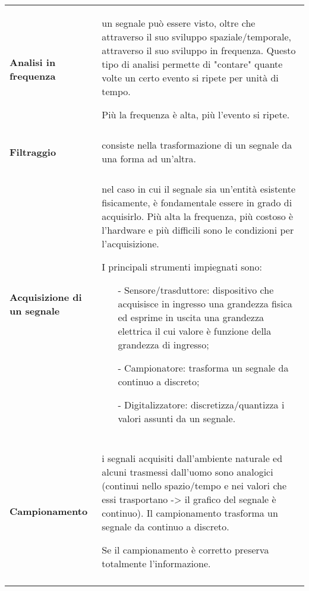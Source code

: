 \documentclass[a4paper, 10pt]{report}
\begin{document}
\begin{tabular}{lp{}}
\textbf{Analisi in frequenza} & un segnale può essere visto, oltre che attraverso il suo sviluppo spaziale/temporale, attraverso il suo sviluppo in frequenza. Questo tipo di analisi permette di "contare" quante volte un certo evento si ripete per unità di tempo.

Più la frequenza è alta, più l'evento si ripete.\\\\

\textbf{Filtraggio} & consiste nella trasformazione di un segnale da una forma ad un'altra.\\\\

\textbf{Acquisizione di un segnale} & nel caso in cui il segnale sia un'entità esistente fisicamente, è fondamentale  essere in grado di acquisirlo. Più alta la frequenza, più costoso è l’hardware  e più difficili sono le condizioni per l'acquisizione. 

I principali strumenti impiegnati sono:
\begin{itemize}
\item[-] Sensore/trasduttore: dispositivo che acquisisce in ingresso una grandezza fisica ed esprime in uscita una grandezza elettrica il cui valore è funzione della grandezza di ingresso;
\item[-] Campionatore: trasforma un segnale da continuo a discreto;
\item[-] Digitalizzatore: discretizza/quantizza i valori assunti da un segnale.
\end{itemize}

\\\\ \textbf{Campionamento} & i segnali acquisiti dall’ambiente naturale ed alcuni trasmessi dall’uomo sono analogici (continui nello spazio/tempo e nei valori che essi trasportano -> il grafico del segnale è continuo). Il campionamento trasforma un segnale da continuo a discreto.

Se il campionamento è corretto preserva totalmente l'informazione.\\\\

\end{tabular}
\end{document}
